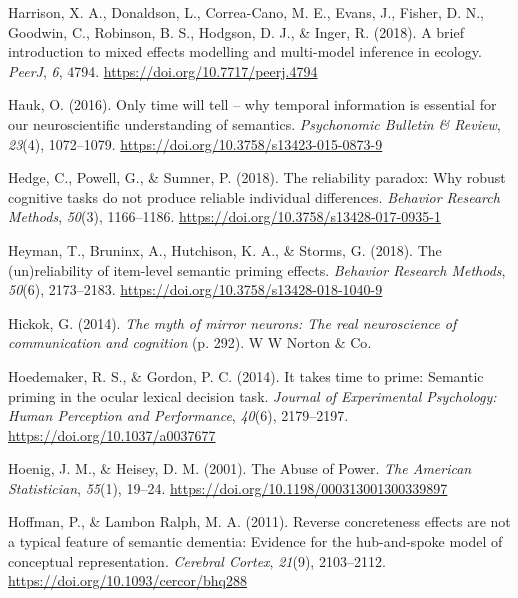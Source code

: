 \documentclass[
  12pt,
  man,floatsintext]{apa7}
\newlength{\cslhangindent}
\newlength{\cslentryspacingunit} %
\newenvironment{CSLReferences}[2] %
 {%
  \setlength{\parindent}{0pt}
  \ifodd #1
  \let\oldpar\par
  \def\par{\hangindent=\cslhangindent\oldpar}
  \fi
  \setlength{\parskip}{#2\cslentryspacingunit}
 }%
 {}
\begin{document}
\begin{CSLReferences}{1}{0}
\leavevmode{}%
Harrison, X. A., Donaldson, L., Correa-Cano, M. E., Evans, J., Fisher, D. N., Goodwin, C., Robinson, B. S., Hodgson, D. J., \& Inger, R. (2018). A brief introduction to mixed effects modelling and multi-model inference in ecology. \emph{PeerJ}, \emph{6}, 4794. \url{https://doi.org/10.7717/peerj.4794}

\leavevmode{}%
Hauk, O. (2016). Only time will tell -- why temporal information is essential for our neuroscientific understanding of semantics. \emph{Psychonomic Bulletin \& Review}, \emph{23}(4), 1072--1079. \url{https://doi.org/10.3758/s13423-015-0873-9}

\leavevmode{}%
Hedge, C., Powell, G., \& Sumner, P. (2018). The reliability paradox: {Why} robust cognitive tasks do not produce reliable individual differences. \emph{Behavior Research Methods}, \emph{50}(3), 1166--1186. \url{https://doi.org/10.3758/s13428-017-0935-1}

\leavevmode{}%
Heyman, T., Bruninx, A., Hutchison, K. A., \& Storms, G. (2018). The (un)reliability of item-level semantic priming effects. \emph{Behavior Research Methods}, \emph{50}(6), 2173--2183. \url{https://doi.org/10.3758/s13428-018-1040-9}

\leavevmode{}%
Hickok, G. (2014). \emph{The myth of mirror neurons: {The} real neuroscience of communication and cognition} (p. 292). {W W Norton \& Co}.

\leavevmode{}%
Hoedemaker, R. S., \& Gordon, P. C. (2014). It takes time to prime: {Semantic} priming in the ocular lexical decision task. \emph{Journal of Experimental Psychology: Human Perception and Performance}, \emph{40}(6), 2179--2197. \url{https://doi.org/10.1037/a0037677}

\leavevmode{}%
Hoenig, J. M., \& Heisey, D. M. (2001). The {Abuse} of {Power}. \emph{The American Statistician}, \emph{55}(1), 19--24. \url{https://doi.org/10.1198/000313001300339897}

\leavevmode{}%
Hoffman, P., \& Lambon Ralph, M. A. (2011). Reverse concreteness effects are not a typical feature of semantic dementia: {Evidence} for the hub-and-spoke model of conceptual representation. \emph{Cerebral Cortex}, \emph{21}(9), 2103--2112. \url{https://doi.org/10.1093/cercor/bhq288}


\end{CSLReferences}
\end{document}

